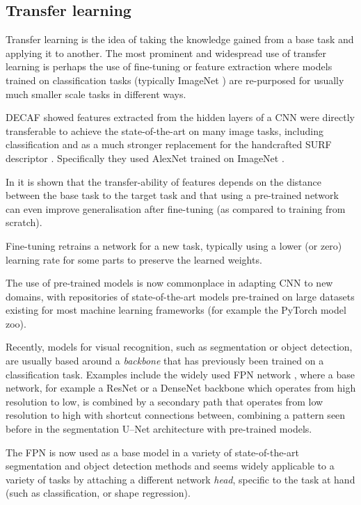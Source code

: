 \subsection {Transfer learning}

Transfer learning is the idea of taking the knowledge gained from a base task and applying it to another. The most prominent and widespread use of transfer learning is perhaps the use of fine-tuning or feature extraction where models trained on classification tasks (typically ImageNet \cite{JiaDeng2009}) are re-purposed for usually much smaller scale tasks in different ways. 

\gls{DECAF} \cite{Donahue2014} showed features extracted from the hidden layers of a \gls{CNN} were directly transferable to achieve the state-of-the-art on many image tasks, including classification and as a much stronger replacement for the handcrafted \gls{SURF} descriptor \cite{bay2006surf}.  Specifically they used AlexNet  \cite{Krizhevsky2012} trained on ImageNet \cite{JiaDeng2009}.

In \cite{Yosinski} it is shown that the transfer-ability of features depends on the distance between the base task to the target task and that using a pre-trained network can even improve generalisation after fine-tuning (as compared to training from scratch).

Fine-tuning retrains a network for a new task, typically using a lower (or zero) learning rate for some parts to preserve the learned weights. 

The use of pre-trained models is now commonplace in adapting \gls{CNN} to new domains, with repositories of state-of-the-art models pre-trained on large datasets existing for most machine learning frameworks (for example the PyTorch \cite{Paszke2017} model zoo). 

Recently, models for visual recognition, such as segmentation or object detection, are usually based around a \emph{backbone} that has previously been trained on a classification task. Examples include the widely used \gls{FPN} network \cite{Lin2017a}, where a base network, for example a ResNet \cite{He} or a DenseNet \cite{Huang2016} backbone which operates from high resolution to low, is combined by a secondary path that operates from low resolution to high with shortcut connections between, combining a pattern seen before in the segmentation U--Net \cite{Ronneberger2015} architecture with pre-trained models.

The \gls{FPN} is now used as a base model in a variety of state-of-the-art segmentation and object detection methods and seems widely applicable to a variety of tasks by attaching a different network \emph{head}, specific to the task at hand (such as classification, or shape regression).


